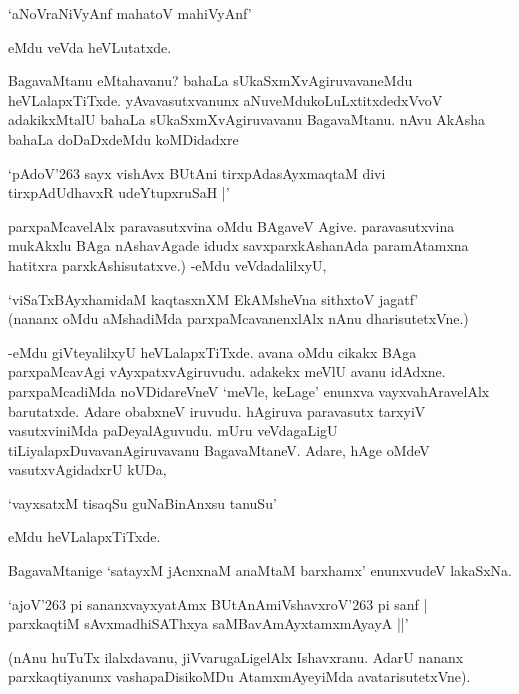 \begin{shloka}
`aNoVraNiVyAnf mahatoV mahiVyAnf'
\end{shloka}

eMdu veVda heVLutatxde.

BagavaMtanu eMtahavanu? bahaLa sUkaSxmXvAgiruvavaneMdu heVLalapxTiTxde. yAvavasutxvanunx aNuveMdukoLuLxtitxdedxVvoV adakikxMtalU bahaLa sUkaSxmXvAgiruvavanu BagavaMtanu. nAvu AkAsha bahaLa doDaDxdeMdu koMDidadxre 

\begin{shloka}
`pAdoV\char'263 sayx vishAvx BUtAni tirxpAdasAyxmaqtaM divi\\
tirxpAdUdhavxR udeYtupxruSaH‌ |'
\end{shloka}

parxpaMcavelAlx paravasutxvina oMdu BAgaveV Agive. paravasutxvina mukAkxlu BAga nAshavAgade idudx savxparxkAshanAda paramAtamxna hatitxra parxkAshisutatxve.) -eMdu veVdadalilxyU,

\begin{shloka}
`viSaTxBAyxhamidaM kaqtasxnXM EkAMsheVna sithxtoV jagatf'\\
(nananx oMdu aMshadiMda parxpaMcavanenxlAlx nAnu dharisutetxVne.)
\end{shloka}

-eMdu giVteyalilxyU heVLalapxTiTxde. avana oMdu cikakx BAga parxpaMcavAgi vAyxpatxvAgiruvudu. adakekx meVlU avanu idAdxne. parxpaMcadiMda noVDidareVneV `meVle, keLage' enunxva vayxvahAravelAlx barutatxde. Adare obabxneV iruvudu. hAgiruva paravasutx tarxyiV vasutxviniMda paDeyalAguvudu. mUru veVdagaLigU tiLiyalapxDuvavanAgiruvavanu BagavaMtaneV. Adare, hAge oMdeV vasutxvAgidadxrU kUDa,

\begin{shloka}
`vayxsatxM tisaqSu guNaBinAnxsu tanuSu'
\end{shloka}

eMdu heVLalapxTiTxde.

BagavaMtanige `satayxM jAcnxnaM anaMtaM barxhamx' enunxvudeV lakaSxNa.

\begin{shloka}
`ajoV\char'263 pi sananxvayxyatAmx BUtAnAmiVshavxroV\char'263 pi sanf |\\
parxkaqtiM sAvxmadhiSAThxya saMBavAmAyxtamxmAyayA ||'
\end{shloka}

(nAnu huTuTx ilalxdavanu, jiVvarugaLigelAlx Ishavxranu. AdarU nananx parxkaqtiyanunx vashapaDisikoMDu AtamxmAyeyiMda avatarisutetxVne).


